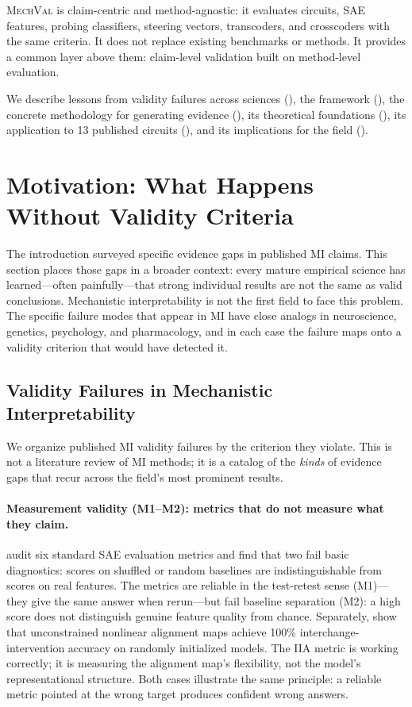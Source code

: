 \documentclass{article}
\newcommand{\mechval}{\textsc{MechVal}}
\begin{document}
\mechval{} is claim-centric and method-agnostic: it evaluates circuits, SAE features, probing classifiers, steering vectors, transcoders, and crosscoders with the same criteria. It does not replace existing benchmarks or methods. It provides a common layer above them: claim-level validation built on method-level evaluation.

We describe lessons from validity failures across sciences (), the framework (), the concrete methodology for generating evidence (), its theoretical foundations (), its application to 13 published circuits (), and its implications for the field ().


\section{Motivation: What Happens Without Validity Criteria}
\label{sec:motivation}

The introduction surveyed specific evidence gaps in published MI claims. This section places those gaps in a broader context: every mature empirical science has learned---often painfully---that strong individual results are not the same as valid conclusions. Mechanistic interpretability is not the first field to face this problem. The specific failure modes that appear in MI have close analogs in neuroscience, genetics, psychology, and pharmacology, and in each case the failure maps onto a validity criterion that would have detected it.

\subsection{Validity Failures in Mechanistic Interpretability}
\label{sec:mi-failures}

We organize published MI validity failures by the criterion they violate. This is not a literature review of MI methods; it is a catalog of the \emph{kinds} of evidence gaps that recur across the field's most prominent results.

\paragraph{Measurement validity (M1--M2): metrics that do not measure what they claim.}
\citet{karvonen2025saebench} audit six standard SAE evaluation metrics and find that two fail basic diagnostics: scores on shuffled or random baselines are indistinguishable from scores on real features. The metrics are reliable in the test-retest sense (M1)---they give the same answer when rerun---but fail baseline separation (M2): a high score does not distinguish genuine feature quality from chance. Separately, \citet{sutter2025nonlinear} show that unconstrained nonlinear alignment maps achieve 100\% interchange-intervention accuracy on randomly initialized models. The IIA metric is working correctly; it is measuring the alignment map's flexibility, not the model's representational structure. Both cases illustrate the same principle: a reliable metric pointed at the wrong target produces confident wrong answers.
\end{document}
